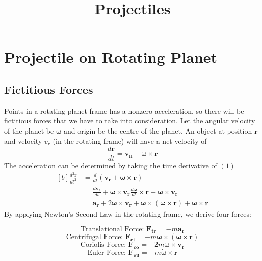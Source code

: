 \documentclass[12pt]{article}
\title{Projectiles}
\newcommand{\bs}[1]{\boldsymbol{#1}}
\newcommand{\om}{\omega}
\begin{document}
\maketitle

\section{Projectile on Rotating Planet}

\subsection{Fictitious Forces}
Points in a rotating planet frame has a nonzero acceleration, so there will be fictitious forces that we have to take into consideration. Let the angular velocity of the planet be $\bs{\om}$ and origin be the centre of the planet. An object at position $\bs{r}$ and velocity $v_r$ (in the rotating frame) will have a net velocity of 
\begin{equation} \frac{d\bs{r}}{dt} = \bs{v_n} + \bs{\om} \times \bs{r} \end{equation}
The acceleration can be determined by taking the time derivative of $(1)$
\begin{equation} 
\begin{aligned}[b]
\frac{d^2\bs{r}}{dt^2} &= \frac{d}{dt}(\bs{v_r} + \bs{\om} \times \bs{r})\\
& = \frac{d\bs{v_r}}{dt} + \bs{\om} \times \bs{v_r} \frac{d\bs{\om}}{dt} \times \bs{r} + \bs{\om} \times \bs{v_r}\\
& = \bs{a_r} +  2\bs{\om} \times \bs{v_r} + \bs{\om} \times (\bs{\om} \times \bs{r}) + \dot{\bs{\om}} \times \bs{r}
\end{aligned}
\end{equation}
By applying Newton's Second Law in the rotating frame, we derive four forces:
\begin{center}
\begin{equation}\text{Translational Force: } \bs{F_{tr}} = -m\bs{a_r}\end{equation}
\begin{equation}\text{Centrifugal Force: } \bs{F_{cf}} = -m\bs{\om} \times (\bs{\om} \times \bs{r})\end{equation}
\begin{equation}\text{Coriolis Force: } \bs{F_{co}} = -2m\bs{\om} \times \bs{v_r}\end{equation}
\begin{equation}\text{Euler Force: } \bs{F_{eu}} = -m\dot{\bs{\om}} \times \bs{r}\end{equation}
\end{center}
\end{document}
